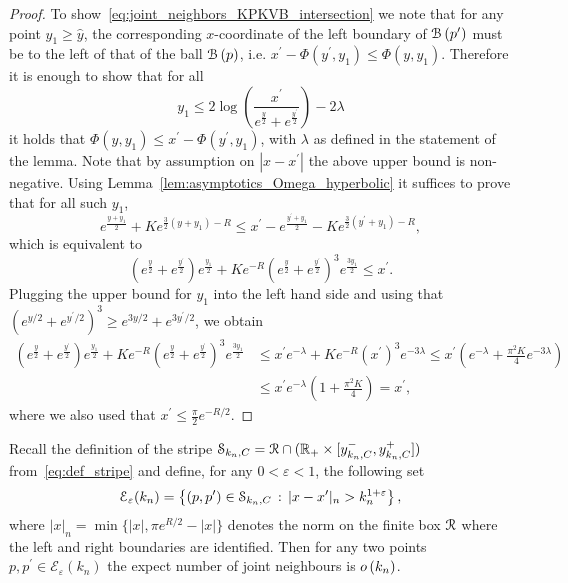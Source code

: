 \begin{proof}
To show~\eqref{eq:joint_neighbors_KPKVB_intersection} we note that for any point $y_1 \ge \hat{y}$, the corresponding $x$-coordinate of the left boundary of ${\mathcal B}\left(p^\prime\right)$ must be to the left of that of the ball ${\mathcal B}\left(p\right)$, i.e.
$x^\prime - \Phi(y^\prime, y_1) \le \Phi(y,y_1)$. Therefore it is enough to show that for all 
\[
	y_1 \le 2 \log\left(\frac{x^\prime}{e^{\frac{y}{2}} + e^{\frac{y^\prime}{2}}}\right) - 2\lambda
\]
it holds that $\Phi(y,y_1) \le x^\prime - \Phi(y^\prime, y_1)$, with $\lambda$ as defined in the statement of the lemma. Note that by assumption on $|x - x^\prime|$ the above upper bound is non-negative. Using Lemma~\ref{lem:asymptotics_Omega_hyperbolic} it suffices to prove that for all such $y_1$,
\[
	e^{\frac{y + y_1}{2}} + K e^{\frac{3}{2}(y + y_1) - R} \le x^\prime - e^{\frac{y^\prime + y_1}{2}}
	- K e^{\frac{3}{2}(y^\prime + y_1) - R},
\]
which is equivalent to
\[
	\left(e^{\frac{y}{2}} + e^{\frac{y^\prime}{2}}\right) e^{\frac{y_1}{2}} 
	+ K e^{-R} \left(e^{\frac{y}{2}} + e^{\frac{y^\prime}{2}}\right)^3 e^{\frac{3 y_1}{2}} \le x^\prime.
\]
Plugging the upper bound for $y_1$ into the left hand side and using that $(e^{y/2} + e^{y^\prime/2})^3 \ge e^{3y/2} + e^{3y^\prime/2}$, we obtain
\begin{align*}
	\left(e^{\frac{y}{2}} + e^{\frac{y^\prime}{2}}\right) e^{\frac{y_1}{2}} 
		+ K e^{-R} \left(e^{\frac{y}{2}} + e^{\frac{y^\prime}{2}}\right)^3 e^{\frac{3 y_1}{2}}
	&\le x^\prime e^{-\lambda} + K e^{-R} (x^\prime)^3 e^{-3\lambda}
		\le x^\prime \left(e^{-\lambda} + \frac{\pi^2 K}{4} e^{-3\lambda}\right)\\
	&\le x^\prime e^{-\lambda} \left(1 + \frac{\pi^2 K}{4}\right) = x^\prime,
\end{align*} 
where we also used that $x^\prime \le \frac{\pi}{2} e^{-R/2}$.
\end{proof}

Recall the definition of the stripe $\mathcal{S}_{k_n,C} = {\mathcal R} \cap ({\mathbb R}_+ \times [y_{k_n,C}^-, y_{k_n,C}^+])$ from~\eqref{eq:def_stripe} and define, for any $0 < \varepsilon < 1$, the following set
\begin{equation}\label{eq:def_joint_degree_set_E_growing_k}
	\mathcal{E}_{\varepsilon}(k_n) = \left\{(p,p^\prime) \in \mathcal{S}_{k_n,C}
		\, : \,  |x - x^\prime|_n > k_n^{1 + \varepsilon} \right\}, 
\end{equation}
where $|x|_n = \min\{|x|, \pi e^{R/2} - |x|\}$ denotes the norm on the finite box ${\mathcal R}$ where the left and right boundaries are identified. Then for any two points $p,p^\prime \in \mathcal{E}_\varepsilon(k_n)$ the expect number of joint neighbours is $o\left(k_n\right)$.

